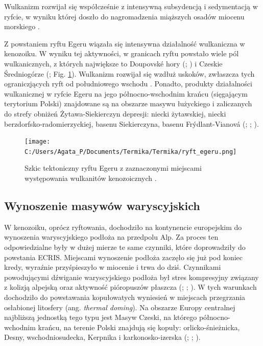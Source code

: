 \documentclass[11.5pt,twoside]{report}
\begin{document}
 Wulkanizm rozwijał się współcześnie z intensywną subsydencją i sedymentacją w ryfcie, w wyniku której doszło do nagromadzenia miąższych osadów miocenu morskiego \parencite{Grygar.2016}.

Z powstaniem ryftu Egeru wiązała się intensywna działalność wulkaniczna w kenozoiku. W wyniku tej aktywności, w granicach ryftu powstało wiele pól wulkanicznych, z których największe to Doupovsk\'{e} hory (\cite{Haloda.2012}; \cite{Skacelova.2009}) i Czeskie Średniogórze (\cite{Cajz.2009}; Fig. \ref{cajz}). Wulkanizm rozwijał się wzdłuż uskoków, zwłaszcza tych ograniczjących ryft od południowego wschodu \parencite{Grygar.2016}. Ponadto, produkty działalności wulkanicznej w ryfcie Egeru na jego północno-wschodnim krańcu (sięgającym terytorium Polski) znajdowane są na obszarze masywu łużyckiego i zaliczanych do strefy obniżeń Żytawa-Siekierczyn depresji: niecki żytawskiej, niecki berzdorfsko-radomierzyckiej, basenu Siekierczyna, basenu Fr\'{y}dlant-Vianov\'{a} (\cite{Woloszyn.2017}; \cite{Cajz.2009}; \cite{Piatkowska.2000}). 


\begin{figure}[h]
	\centering
	\texttt{[image: C:/Users/Agata\_P/Documents/Termika/Termika/ryft\_egeru.png]}
	\caption{Szkic tektoniczny ryftu Egeru z zaznaczonymi miejscami występowania wulkanitów kenozoicznych \parencite{Cajz.2009}.}
	\label{cajz}
\end{figure}


	\subsection{Wynoszenie masywów waryscyjskich}
	
W kenozoiku, oprócz ryftowania, dochodziło na kontynencie europejskim do wynoszenia waryscyjskiego podłoża na przedpolu Alp. Za proces ten odpowiedzialne były w dużej mierze te same czynniki, które doprowadziły do powstania ECRIS. Miejscami wynoszenie podłoża zaczęło się już pod koniec kredy, wyra\'{z}nie przyśpieszyło w miocenie i trwa do dziś. Czynnikami powodującymi d\'{z}wiganie waryscyjskiego podłoża był stres kompresyjny związany z kolizją alpejską oraz aktywność pióropuszów płaszcza (\cite{Ziegler.2007}; \cite{Wilson.2006}; \cite{Wilson.2001}). W tych warunkach dochodziło do powstawania kopułowatych wyniesień w miejscach przegrzania osłabionej litosfery (ang. \textit{thermal doming}). Na obszarze Europy centralnej najbliższą jednostką tego typu jest Masyw Czeski, na którego północno-wchodnim krańcu, na terenie Polski znajdują się kopuły: orlicko-śnieżnicka, Desny, wschodniosudecka, Kerpnika i karkonosko-izerska (\cite{Cymerman.2016}; \cite{Mazur.2001}; \cite{Maluski.1995}). 
\end{document}
